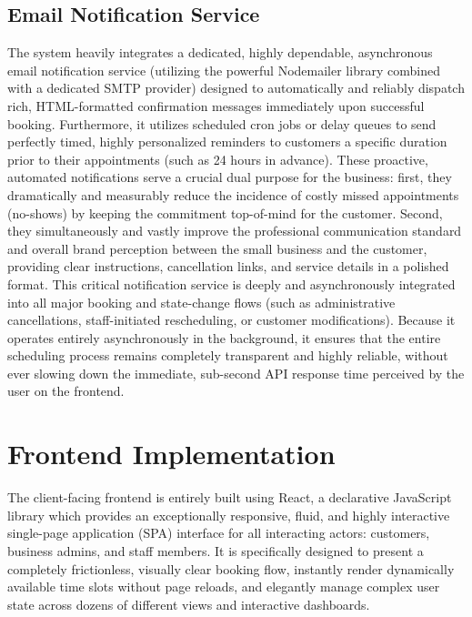 \subsection{Email Notification Service}
The system heavily integrates a dedicated, highly dependable, asynchronous email notification service (utilizing the powerful Nodemailer library combined with a dedicated SMTP provider) designed to automatically and reliably dispatch rich, HTML-formatted confirmation messages immediately upon successful booking. Furthermore, it utilizes scheduled cron jobs or delay queues to send perfectly timed, highly personalized reminders to customers a specific duration prior to their appointments (such as 24 hours in advance). These proactive, automated notifications serve a crucial dual purpose for the business: first, they dramatically and measurably reduce the incidence of costly missed appointments (no-shows) by keeping the commitment top-of-mind for the customer. Second, they simultaneously and vastly improve the professional communication standard and overall brand perception between the small business and the customer, providing clear instructions, cancellation links, and service details in a polished format. This critical notification service is deeply and asynchronously integrated into all major booking and state-change flows (such as administrative cancellations, staff-initiated rescheduling, or customer modifications). Because it operates entirely asynchronously in the background, it ensures that the entire scheduling process remains completely transparent and highly reliable, without ever slowing down the immediate, sub-second API response time perceived by the user on the frontend.

\section{Frontend Implementation}
The client-facing frontend is entirely built using React, a declarative JavaScript library which provides an exceptionally responsive, fluid, and highly interactive single-page application (SPA) interface for all interacting actors: customers, business admins, and staff members. It is specifically designed to present a completely frictionless, visually clear booking flow, instantly render dynamically available time slots without page reloads, and elegantly manage complex user state across dozens of different views and interactive dashboards.

